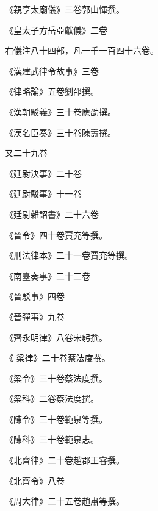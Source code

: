 \begin{pinyinscope}
 《親享太廟儀》三卷郭山惲撰。



 《皇太子方岳亞獻儀》二卷



 右儀注八十四部，凡一千一百四十六卷。



 《漢建武律令故事》三卷



 《律略論》五卷劉邵撰。



 《漢朝駁義》三十卷應劭撰。



 《漢名臣奏》三十卷陳壽撰。



 又二十九卷



 《廷尉決事》二十卷



 《廷尉駁事》十一卷



 《廷尉雜詔書》二十六卷



 《晉令》四十卷賈充等撰。



 《刑法律本》二十一卷賈充等撰。



 《南臺奏事》二十二卷



 《晉駁事》四卷



 《晉彈事》九卷



 《齊永明律》八卷宋躬撰。



 《
 梁律》二十卷蔡法度撰。



 《梁令》三十卷蔡法度撰。



 《梁科》二卷蔡法度撰。



 《陳令》三十卷範泉等撰。



 《陳科》三十卷範泉志。



 《北齊律》二十卷趙郡王睿撰。



 《北齊令》八卷



 《周大律》二十五卷趙肅等撰。




\end{pinyinscope}
